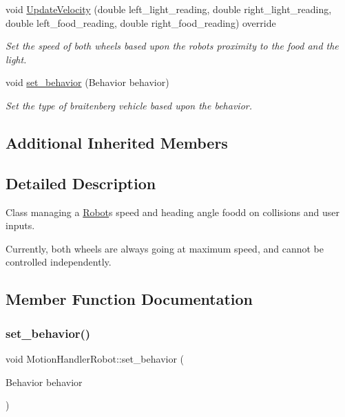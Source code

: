 \begin{DoxyCompactItemize}
void \mbox{\hyperlink{class_motion_handler_robot_a2afe4dbe1eb88998442f6f41ce8f0c2c}{Update\+Velocity}} (double left\+\_\+light\+\_\+reading, double right\+\_\+light\+\_\+reading, double left\+\_\+food\+\_\+reading, double right\+\_\+food\+\_\+reading) override
\begin{DoxyCompactList}\small\item\em Set the speed of both wheels based upon the robots proximity to the food and the light. \end{DoxyCompactList}\item 
void \mbox{\hyperlink{class_motion_handler_robot_accf55d58d0ddae44c4e054f7784b9e9a}{set\+\_\+behavior}} (Behavior behavior)
\begin{DoxyCompactList}\small\item\em Set the type of braitenberg vehicle based upon the behavior. \end{DoxyCompactList}\end{DoxyCompactItemize}
\subsection*{Additional Inherited Members}


\subsection{Detailed Description}
Class managing a \mbox{\hyperlink{class_robot}{Robot}}\textquotesingle{}s speed and heading angle foodd on collisions and user inputs. 

Currently, both wheels are always going at maximum speed, and cannot be controlled independently. 

\subsection{Member Function Documentation}
\mbox{\label{class_motion_handler_robot_accf55d58d0ddae44c4e054f7784b9e9a}} 
\subsubsection{\texorpdfstring{set\+\_\+behavior()}{set\_behavior()}}
{\footnotesize\ttfamily void Motion\+Handler\+Robot\+::set\+\_\+behavior (\begin{DoxyParamCaption}\item[{Behavior}]{behavior }\end{DoxyParamCaption})}



